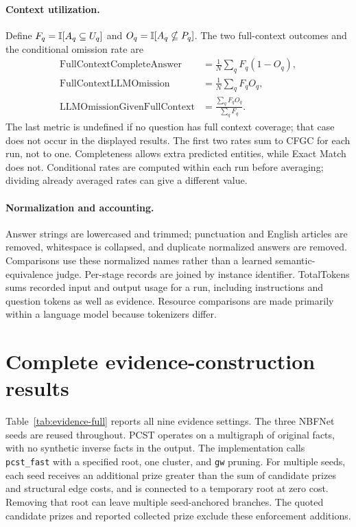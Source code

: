 \paragraph{Context utilization.}
Define $F_q=\mathbb{I}[A_q\subseteq U_q]$ and $O_q=\mathbb{I}[A_q\nsubseteq P_q]$. The two full-context outcomes and the conditional omission rate are
\begin{align}
 \operatorname{FullContextCompleteAnswer}&=\frac1N\sum_q F_q(1-O_q),\\
 \operatorname{FullContextLLMOmission}&=\frac1N\sum_q F_qO_q,\\
 \operatorname{LLMOmissionGivenFullContext}&=\frac{\sum_q F_qO_q}{\sum_q F_q}.
 \label{eq:conditional-omission}
\end{align}
The last metric is undefined if no question has full context coverage; that case does not occur in the displayed results. The first two rates sum to CFGC for each run, not to one. Completeness allows extra predicted entities, while Exact Match does not. Conditional rates are computed within each run before averaging; dividing already averaged rates can give a different value.

\paragraph{Normalization and accounting.}
Answer strings are lowercased and trimmed; punctuation and English articles are removed, whitespace is collapsed, and duplicate normalized answers are removed. Comparisons use these normalized names rather than a learned semantic-equivalence judge. Per-stage records are joined by instance identifier. TotalTokens sums recorded input and output usage for a run, including instructions and question tokens as well as evidence. Resource comparisons are made primarily within a language model because tokenizers differ.

\section{Complete evidence-construction results}
\label{app:evidence-results}

Table~\ref{tab:evidence-full} reports all nine evidence settings. The three NBFNet seeds are reused throughout. PCST operates on a multigraph of original facts, with no synthetic inverse facts in the output. The implementation calls \texttt{pcst\_fast} with a specified root, one cluster, and \texttt{gw} pruning. For multiple seeds, each seed receives an additional prize greater than the sum of candidate prizes and structural edge costs, and is connected to a temporary root at zero cost. Removing that root can leave multiple seed-anchored branches. The quoted candidate prizes and reported collected prize exclude these enforcement additions.

